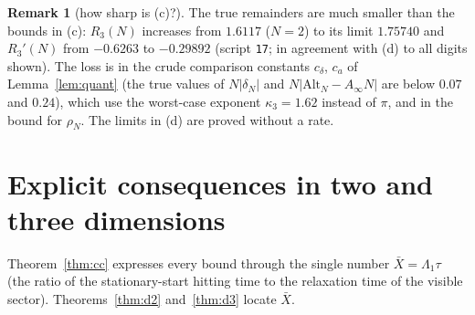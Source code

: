 \documentclass[11pt,a4paper]{article}
\newcommand{\Xb}{\bar X}
\theoremstyle{plain}
\theoremstyle{definition}
\newtheorem{remark}[theorem]{Remark}
\numberwithin{equation}{section}
\begin{document}
\begin{remark}[how sharp is (c)?]\label{rem:d3sharp}
The true remainders are much smaller than the bounds in (c): $R_3(N)$ increases from $1.6117$ ($N=2$) to its limit $1.75740$ and $R_3'(N)$ from $-0.6263$ to $-0.29892$ (script \texttt{17}; in agreement with (d) to all digits shown). The loss is in the crude comparison constants $c_\delta$, $c_a$ of Lemma~\ref{lem:quant} (the true values of $N|\delta_N|$ and $N|\mathrm{Alt}_N-A_\infty N|$ are below $0.07$ and $0.24$), which use the worst-case exponent $\kappa_3=1.62$ instead of $\pi$, and in the bound for $\rho_N$. The limits in (d) are proved without a rate.
\end{remark}


\section{Explicit consequences in two and three dimensions}\label{sec:explicit}

Theorem~\ref{thm:cc} expresses every bound through the single number $\Xb=\Lambda_1\tau$ (the ratio of the stationary-start hitting time to the relaxation time of the visible sector). Theorems~\ref{thm:d2} and~\ref{thm:d3} locate $\Xb$.
\end{document}
